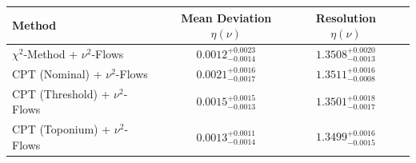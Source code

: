     \begin{tabular}{lccc}
        \toprule
        Method & Mean Deviation $\eta({\nu})$ & Resolution $\eta({\nu})$ \\
        \midrule
        $\chi^2$-Method + $\nu^2$-Flows & $0.0012^{+0.0023}_{-0.0014}$ & $1.3508^{+0.0020}_{-0.0013}$ \\
        CPT (Nominal) + $\nu^2$-Flows & $0.0021^{+0.0016}_{-0.0017}$ & $1.3511^{+0.0016}_{-0.0008}$ \\
        CPT (Threshold) + $\nu^2$-Flows & $0.0015^{+0.0015}_{-0.0013}$ & $1.3501^{+0.0018}_{-0.0017}$ \\
        CPT (Toponium) + $\nu^2$-Flows & $0.0013^{+0.0011}_{-0.0014}$ & $1.3499^{+0.0016}_{-0.0015}$ \\
        \bottomrule
    \end{tabular}